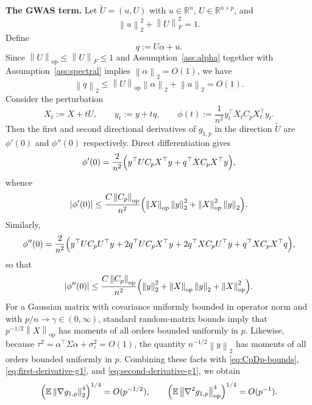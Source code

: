 \documentclass[11pt]{article}
\theoremstyle{definition}
\newcommand{\R}{\mathbb{R}}
\newcommand{\E}{\mathbb{E}}
\newcommand{\op}{\mathrm{op}}
\newcommand{\1}{\mathbf{1}}
\newcommand{\norm}[1]{\left\lVert #1 \right\rVert}
\newcommand{\abs}[1]{\left\lvert #1 \right\rvert}
\begin{document}
\medskip
\noindent
\textbf{The GWAS term.}
Let $\widetilde U=(u,U)$ with $u\in\R^n$, $U\in\R^{n\times p}$, and
\[
 \norm{u}_2^2+\norm{U}_F^2=1.
\]
Define
\[
 q:=U\alpha+u.
\]
Since $\norm{U}_{\op}\le \norm{U}_F\le 1$ and Assumption~\ref{ass:alpha} together with Assumption~\ref{ass:spectral} implies $\norm{\alpha}_2=O(1)$, we have
\begin{equation}\label{eq:q-bound}
 \norm{q}_2\le \norm{U}_{\op}\norm{\alpha}_2+\norm{u}_2=O(1).
\end{equation}
Consider the perturbation
\[
 X_t:=X+tU,
 \qquad
 y_t:=y+tq,
 \qquad
 \phi(t):=\frac1{n^2}y_t^\top X_t C_p X_t^\top y_t.
\]
Then the first and second directional derivatives of $g_{1,p}$ in the direction $\widetilde U$ are $\phi'(0)$ and $\phi''(0)$ respectively. Direct differentiation gives
\[
 \phi'(0)=\frac{2}{n^2}\Bigl(y^\top U C_p X^\top y+q^\top X C_p X^\top y\Bigr),
\]
whence
\begin{equation}\label{eq:first-derivative-g1}
 \abs{\phi'(0)}
 \le \frac{C\norm{C_p}_{\op}}{n^2}
 \Bigl(\norm{X}_{\op}\norm{y}_2^2+\norm{X}_{\op}^2\norm{y}_2\Bigr).
\end{equation}
Similarly,
\[
 \phi''(0)=\frac{2}{n^2}\Bigl(y^\top U C_p U^\top y+2q^\top U C_p X^\top y+2q^\top X C_p U^\top y+q^\top X C_p X^\top q\Bigr),
\]
so that
\begin{equation}\label{eq:second-derivative-g1}
 \abs{\phi''(0)}
 \le \frac{C\norm{C_p}_{\op}}{n^2}
 \Bigl(\norm{y}_2^2+\norm{X}_{\op}\norm{y}_2+\norm{X}_{\op}^2\Bigr).
\end{equation}
For a Gaussian matrix with covariance uniformly bounded in operator norm and with $p/n\to\gamma\in(0,\infty)$, standard random-matrix bounds imply that $p^{-1/2}\norm{X}_{\op}$ has moments of all orders bounded uniformly in $p$. Likewise, because $\tau^2=\alpha^\top\Sigma\alpha+\sigma_\varepsilon^2=O(1)$, the quantity $n^{-1/2}\norm{y}_2$ has moments of all orders bounded uniformly in $p$. Combining these facts with \eqref{eq:CpDp-bounds}, \eqref{eq:first-derivative-g1}, and \eqref{eq:second-derivative-g1}, we obtain
\begin{equation}\label{eq:kappa-g1}
 \Bigl(\E\norm{\nabla g_{1,p}}_2^4\Bigr)^{1/4}=O(p^{-1/2}),
 \qquad
 \Bigl(\E\norm{\nabla^2 g_{1,p}}_{\op}^4\Bigr)^{1/4}=O(p^{-1}).
\end{equation}
\end{document}
